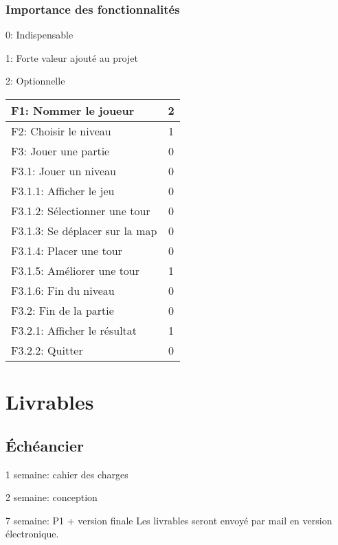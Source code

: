 \documentclass{scrartcl}
\begin{document}
  \begin{flushleft}
		\subsubsection{Importance des fonctionnalités}
0: Indispensable

1: Forte valeur ajouté au projet

2: Optionnelle
  \newline
  
  \begin{tabular}{|l|c|}
    
    \hline
    F1: Nommer le joueur & 2 \\
    \hline
    F2: Choisir le niveau & 1 \\
    \hline
    F3: Jouer une partie & 0 \\
    \hline
    F3.1: Jouer un niveau & 0 \\
    \hline
    F3.1.1: Afficher le jeu & 0 \\
    \hline
    F3.1.2: Sélectionner une tour & 0 \\
    \hline
    F3.1.3: Se déplacer sur la map & 0 \\
    \hline
    F3.1.4: Placer une tour & 0 \\
    \hline
    F3.1.5: Améliorer une tour & 1 \\
    \hline
    F3.1.6: Fin du niveau & 0 \\
    \hline
    F3.2: Fin de la partie & 0 \\
    \hline
    F3.2.1: Afficher le résultat & 1 \\
    \hline
    F3.2.2: Quitter & 0 \\
    \hline

   \end{tabular}
  
    \section{Livrables}
	  \subsection{Échéancier}
  1 semaine: cahier des charges
  
  2 semaine: conception
  
  7 semaine: P1 + version finale
  \newline
  Les livrables seront envoyé par mail en version électronique.
  

\end{flushleft}
\end{document}
